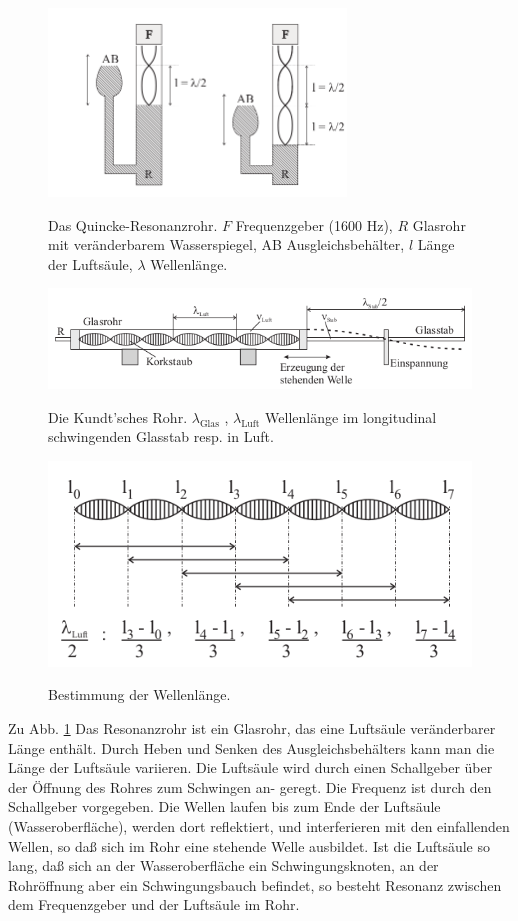\documentclass{article}
\begin{document}
\begin{figure}[H]
\caption{Das Quincke-Resonanzrohr. $F$ Frequenzgeber (1600 Hz), $R$ Glasrohr mit veränderbarem Wasserspiegel, AB Ausgleichsbehälter, $l$ Länge der Luftsäule, $\lambda$ Wellenlänge.}
\includegraphics[height=5cm]{pic1.png}
\label{fig:resonanzrohr}
\end{figure}


\begin{figure}[H]
\caption{Die Kundt'sches Rohr. $\lambda_\text{Glas}$ , $\lambda_\text{Luft}$ Wellenlänge im longitudinal schwingenden Glasstab resp. in Luft.}
\includegraphics[width=\textwidth]{pic2.png}
\label{fig:rohr}
\end{figure}




\begin{figure}[H]
\caption{Bestimmung der Wellenlänge.}
\includegraphics[width=\textwidth]{pic3.png}
\label{fig:wellenlaenge}
\end{figure}


Zu Abb. \ref{fig:resonanzrohr} Das Resonanzrohr ist ein Glasrohr, das eine Luftsäule veränderbarer Länge enthält. Durch Heben und Senken des Ausgleichsbehälters kann man die Länge der Luftsäule variieren. Die Luftsäule wird durch einen Schallgeber über der Öffnung des Rohres zum Schwingen an-
geregt. Die Frequenz ist durch den Schallgeber vorgegeben. Die Wellen laufen bis zum Ende
der Luftsäule (Wasseroberfläche), werden dort reflektiert, und interferieren mit den einfallenden
Wellen, so daß sich im Rohr eine stehende Welle ausbildet. Ist die Luftsäule so lang, daß sich an
der Wasseroberfläche ein Schwingungsknoten, an der Rohröffnung aber ein Schwingungsbauch
befindet, so besteht Resonanz zwischen dem Frequenzgeber und der Luftsäule im Rohr.
\end{document}
